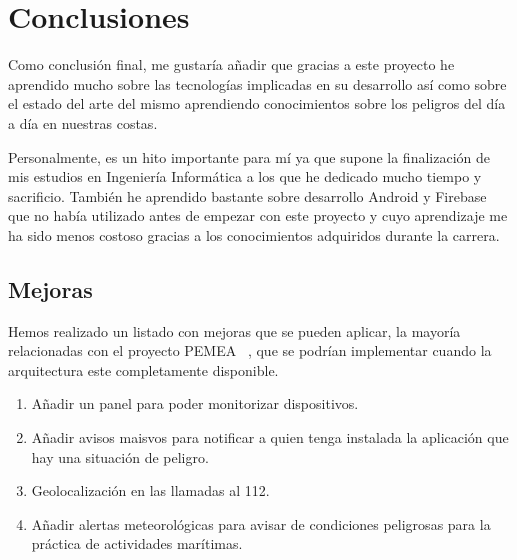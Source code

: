 \chapter{Conclusiones}
\label{conclusiones}


Como conclusión final, me gustaría añadir que gracias a este proyecto
 he aprendido mucho sobre las tecnologías implicadas en su desarrollo
así como sobre el estado del arte del mismo aprendiendo
conocimientos sobre los peligros del día a día en nuestras costas.

Personalmente, es un hito importante para mí ya que supone la
 finalización de mis estudios en Ingeniería Informática a los que he
 dedicado mucho tiempo y sacrificio. También he aprendido bastante
 sobre desarrollo Android y Firebase que no había utilizado antes
 de empezar con este proyecto y cuyo aprendizaje me ha sido
 menos costoso gracias a los conocimientos adquiridos durante la carrera.


\section{Mejoras}

Hemos realizado un listado con mejoras que se pueden aplicar,
 la mayoría relacionadas con el proyecto PEMEA~\cite{PEMEA}
, que se podrían
 implementar cuando la arquitectura este completamente disponible.

\begin{enumerate}
\item Añadir un panel para poder monitorizar dispositivos.
\item Añadir avisos maisvos para notificar a quien tenga instalada
 la aplicación que hay una situación de peligro.
\item Geolocalización en las llamadas al 112.
\item Añadir alertas meteorológicas para avisar de condiciones
 peligrosas para la práctica de actividades marítimas.
\end{enumerate}
